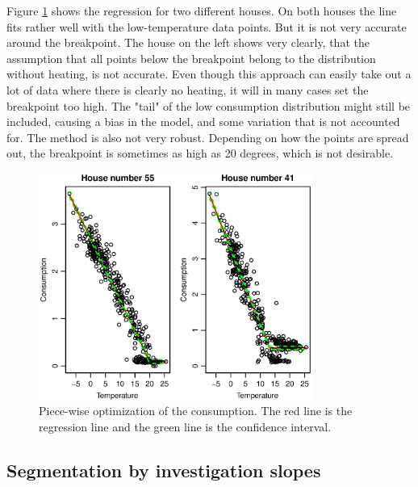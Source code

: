 \noindent Figure \ref{fig: Consumption-PW} shows the regression for two different houses. On both houses the
line fits rather well with the low-temperature data points. But it is not very accurate around the breakpoint.
The house on the left shows very clearly, that the assumption that all points below the breakpoint belong to 
the distribution without heating, is not accurate. Even though this approach can easily take out a lot of data
where there is clearly no heating, it will in many cases set the breakpoint too high. The "tail" of the low
consumption distribution might still be included, causing a bias in the model, and some variation that is not
accounted for. The method is also not very robust. Depending on how the points are spread out, the breakpoint
is sometimes as high as 20 degrees, which is not desirable.
\begin{figure}
    \centering
    \includegraphics[width=0.8\textwidth]{../../../figures/Consumption-PW.eps}
    \caption{Piece-wise optimization of the consumption. The red line is the regression line and the green line is the confidence interval.}
    \label{fig: Consumption-PW}
\end{figure}

\subsection{Segmentation by investigation slopes}


